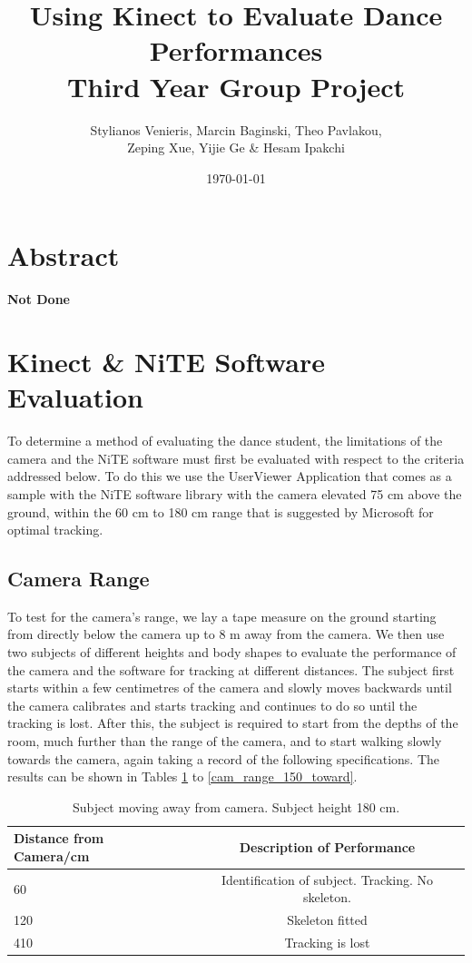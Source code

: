 \documentclass[10pt]{article}
\begin{document}
\title{Using Kinect to Evaluate Dance Performances\\ Third Year Group Project}
\author{Stylianos Venieris, Marcin Baginski, Theo Pavlakou, \\Zeping Xue, Yijie Ge \& Hesam Ipakchi  }
\date{\today}
\maketitle
{}
\newpage

\setcounter{page}{1}
\section*{\center Abstract}
\textbf{Not Done}

\section{Kinect \& NiTE Software Evaluation}
\noindent
To determine a method of evaluating the dance student, the limitations of the camera and the NiTE software must first be evaluated with respect to the criteria addressed below. To do this we use the UserViewer Application that comes as a sample with the NiTE software library with the camera elevated 75 cm above the ground, within the 60 cm to 180 cm range that is suggested by Microsoft for optimal tracking. 

\subsection{Camera Range}
\noindent 
To test for the camera's range, we lay a tape measure on the ground starting from directly below the camera up to 8 m away from the camera. We then use two subjects of different heights and body shapes to evaluate the performance of the camera and the software for tracking at different distances. The subject first starts within a few centimetres of the camera and slowly moves backwards until the camera calibrates and starts tracking and continues to do so until the tracking is lost. After this, the subject is required to start from the depths of the room, much further than the range of the camera, and to start walking slowly towards the camera, again taking a record of the following specifications. The results can be shown in Tables \ref{cam_range_180_away} to \ref{cam_range_150_toward}.
\\
\begin{table}[h]
\center
\begin{tabular}{ | l | c |}
\hline
Distance from Camera/cm & Description of Performance \\
\hline
60 & Identification of subject. Tracking. No skeleton.\\
120 & Skeleton fitted\\
410 & Tracking is lost\\
\hline
\end{tabular}
\caption{Subject moving away from camera. Subject height 180 cm.}
\label{cam_range_180_away}
\end{table}
\end{document}
